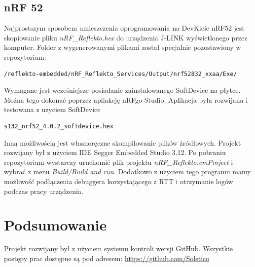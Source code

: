 \documentclass[a4paper,11pt]{article}
\begin{document}
\subsection{nRF 52}
Najprostszym sposobem umieszczenia oprogramowania na DevKicie nRF52 jest skopiowanie pliku \textit{nRF\_Reflekto.hex} do urządzenia J-LINK wyświetlonego przez komputer. Folder z wygenerowanymi plikami został specjalnie pozostawiony w repozytorium: \begin{lstlisting}
/reflekto-embedded/nRF_Reflekto_Services/Output/nrf52832_xxaa/Exe/
\end{lstlisting} 
Wymagane jest wcześniejsze posiadanie zainstalowanego SoftDevice na płytce. Można tego dokonać poprzez apliakcję nRFgo Studio. Aplikacja była rozwijana i testowana z użyciem SoftDevice
\begin{lstlisting}
s132_nrf52_4.0.2_softdevice.hex
\end{lstlisting}
Inną możliwością jest własnoręczne skompilowanie plików źródłowych. Projekt rozwijany był z użyciem IDE Segger Embedded Studio 3.12. Po pobraniu repozytorium wystarczy uruchomić plik projektu
\textit{nRF\_Reflekto.emProject }i wybrać z menu \textit{Build/Build and run}. Dodatkowo z użyciem tego programu mamy możliwość podłączenia debuggera korzystającego z RTT i otrzymanie logów podczas pracy urządzenia.

\section{Podsumowanie}
Projekt rozwijany był z użyciem systemu kontroli wersji GitHub. Wszystkie postępy prac dostępne są pod adresem: \url{https://github.com/Solstico}
	
	
\end{document}
